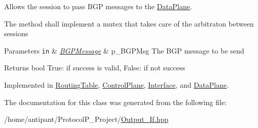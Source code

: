 Allows the session to pass B\-G\-P messages to the \hyperlink{classDataPlane}{Data\-Plane}. 

The method shall implement a mutex that takes care of the arbitraton between sessions 
\begin{DoxyParams}[1]{Parameters}
\mbox{\tt in}  & {\em \hyperlink{classBGPMessage}{B\-G\-P\-Message}} & p\-\_\-\-B\-G\-P\-Msg The B\-G\-P message to be send \\
\hline
\end{DoxyParams}
\begin{DoxyReturn}{Returns}
bool True\-: if success is valid, False\-: if not success 
\end{DoxyReturn}


Implemented in \hyperlink{classRoutingTable_ac54104a090c70c3f23799af1f30113e7}{Routing\-Table}, \hyperlink{classControlPlane_a602bc55e4d99aab6e0b38468afecdc1f}{Control\-Plane}, \hyperlink{classInterface_a38e700c787ec1927f1dfcbecf6d5e67e}{Interface}, and \hyperlink{classDataPlane_a5ffc92484ff41f3ec1a2998ac598fe2f}{Data\-Plane}.



The documentation for this class was generated from the following file\-:\begin{DoxyCompactItemize}
\item 
/home/antipant/\-Protocol\-P\-\_\-\-Project/\hyperlink{Output__If_8hpp}{Output\-\_\-\-If.\-hpp}\end{DoxyCompactItemize}
